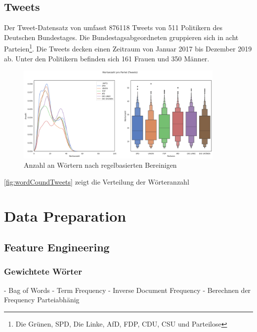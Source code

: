 \subsection{Tweets}

Der Tweet-Datensatz von \textcite{saltzer_finding_2022} umfasst \num{876118} Tweets von \num{511} Politikern des Deutschen Bundestages. Die Bundestagsabgeordneten gruppieren sich in acht Parteien\footnote{Die Grünen, \ac{SPD}, Die Linke, \ac{AfD}, \ac{FDP}, \ac{CDU}, \ac{CSU} und Parteilose}. Die Tweets decken einen Zeitraum von Januar \num{2017} bis Dezember \num{2019} ab. Unter den Politikern befinden sich \num{161} Frauen und \num{350} Männer.


\begin{figure}[H]
    \centering
    \includegraphics[width=0.9\textwidth]{images/tweets_word_count.png}
    \caption{Anzahl an Wörtern nach regelbasierten Bereinigen} \label{fig:wordCoundTweets}
\end{figure}


\autoref{fig:wordCoundTweets} zeigt die Verteilung der Wörteranzahl 

\section{Data Preparation} \label{sec:dataPreparation}

\subsection{Feature Engineering} \label{subsec:featureEngineering}

\subsubsection{Gewichtete Wörter}

- Bag of Words 
- Term Frequency - Inverse Document Frequency 
    - Berechnen der Frequency Parteiabhänig

